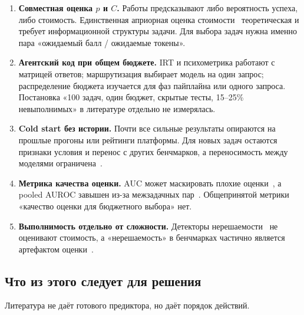 \documentclass[11pt,a4paper]{article}
\begin{document}
\begin{enumerate}
  \item \textbf{Совместная оценка $p$ и $C$.} Работы предсказывают либо
        вероятность успеха, либо стоимость. Единственная априорная оценка
        стоимости~\cite{lutati2025capability} теоретическая и требует
        информационной структуры задачи. Для выбора задач нужна именно пара
        «ожидаемый балл / ожидаемые токены».
  \item \textbf{Агентский код при общем бюджете.} IRT и психометрика работают
        с матрицей ответов; маршрутизация выбирает модель на один запрос;
        распределение бюджета изучается для фаз пайплайна или одного
        запроса. Постановка «100 задач, один бюджет, скрытые тесты,
        15--25\% невыполнимых» в литературе отдельно не измерялась.
  \item \textbf{Cold start без истории.} Почти все сильные результаты
        опираются на прошлые прогоны или рейтинги платформы. Для новых задач
        остаются признаки условия и перенос с других бенчмарков, а
        переносимость между моделями ограничена~\cite{ge2026psychometrics,li2026struggles}.
  \item \textbf{Метрика качества оценки.} AUC может маскировать плохие
        оценки~\cite{krsteski2026difficulty}, а pooled AUROC завышен из-за
        межзадачных пар~\cite{esfandiaridoulabi2026disentangling}. Общепринятой
        метрики «качество оценки для бюджетного выбора» нет.
  \item \textbf{Выполнимость отдельно от сложности.} Детекторы
        нерешаемости~\cite{peng2026solvability,noever2024impossible} не
        оценивают стоимость, а «нерешаемость» в бенчмарках частично является
        артефактом оценки~\cite{garg2026unsolvability}.
\end{enumerate}

\subsection{Что из этого следует для решения}

Литература не даёт готового предиктора, но даёт порядок действий.
\end{document}
